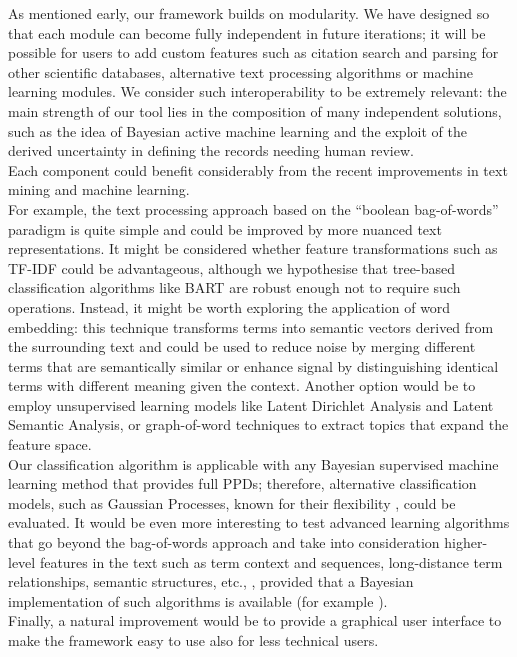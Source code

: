 \documentclass[]{bmcart}
\begin{document}
As mentioned early, our framework builds on modularity. We have designed
so that each module can become fully independent in future iterations;
it will be possible for users to add custom features such as citation
search and parsing for other scientific databases, alternative text
processing algorithms or machine learning modules. We consider such
interoperability to be extremely relevant: the main strength of our tool
lies in the composition of many independent solutions, such as the idea
of Bayesian active machine learning and the exploit of the derived
uncertainty in defining the records needing human review.\\
Each component could benefit considerably from the recent improvements
in text mining and machine learning.\\
For example, the text processing approach based on the ``boolean
bag-of-words'' paradigm is quite simple and could be improved by more
nuanced text representations. It might be considered whether feature
transformations such as TF-IDF
\citep{baeza1999modern, ananiadou2006text} could be advantageous,
although we hypothesise that tree-based classification algorithms like
BART are robust enough not to require such operations. Instead, it might
be worth exploring the application of word embedding: this technique
transforms terms into semantic vectors derived from the surrounding text
\citep{turian2010word, bollegala2015embedding, minaee2021deep} and could
be used to reduce noise by merging different terms that are semantically
similar or enhance signal by distinguishing identical terms with
different meaning given the context. Another option would be to employ
unsupervised learning models like Latent Dirichlet Analysis and Latent
Semantic Analysis,
\citep{pavlinek2017text, chen2016short, landauer1998introduction} or
graph-of-word techniques \citep{ohsawa1998keygraph, rousseau2015graph}
to extract topics that expand the feature space.\\
Our classification algorithm is applicable with any Bayesian supervised
machine learning method that provides full PPDs; therefore, alternative
classification models, such as Gaussian Processes, known for their
flexibility \citep{jayashree2020evaluation, chen2015gaussian}, could be
evaluated. It would be even more interesting to test advanced learning
algorithms that go beyond the bag-of-words approach and take into
consideration higher-level features in the text such as term context and
sequences, long-distance term relationships, semantic structures, etc.,
\citep{cheng2019document, minaee2021deep, li2020survey, yang2020survey, lai2015recurrent, farkas1995document},
provided that a Bayesian implementation of such algorithms is available
(for example \citet{chen2018approximate}).\\
Finally, a natural improvement would be to provide a graphical user
interface to make the framework easy to use also for less technical
users.
\end{document}
